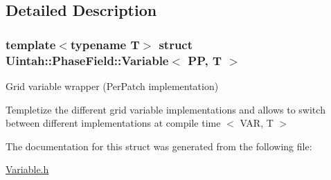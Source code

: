 \subsection{Detailed Description}
\subsubsection*{template$<$typename T$>$\newline
struct Uintah\+::\+Phase\+Field\+::\+Variable$<$ P\+P, T $>$}

Grid variable wrapper (Per\+Patch implementation) 

Templetize the different grid variable implementations and allows to switch between different implementations at compile time $<$ V\+AR, T $>$ 

The documentation for this struct was generated from the following file\+:\begin{DoxyCompactItemize}
\item 
\hyperlink{Variable_8h}{Variable.\+h}\end{DoxyCompactItemize}
